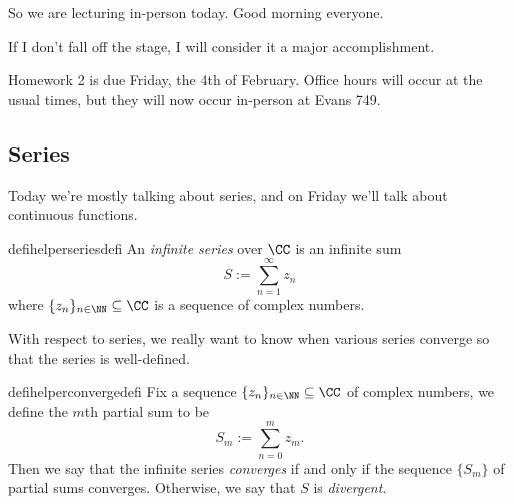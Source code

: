 
So we are lecturing in-person today. Good morning everyone.
\begin{quot}
	If I don't fall off the stage, I will consider it a major accomplishment.
\end{quot}
Homework 2 is due Friday, the 4th of February. Office hours will occur at the usual times, but they will now occur in-person at Evans 749.

\subsection{Series}
Today we're mostly talking about series, and on Friday we'll talk about continuous functions.
\begin{restatable}[Series]{defihelper}{seriesdefi} 
	An \textit{infinite series} over $\CC$ is an infinite sum
	\[S:=\sum_{n=1}^\infty z_n\]
	where $\{z_n\}_{n\in\NN}\subseteq\CC$ is a sequence of complex numbers.
\end{restatable}
\noindent With respect to series, we really want to know when various series converge so that the series is well-defined.
\begin{restatable}{defihelper}{convergedefi} 
	Fix a sequence $\{z_n\}_{n\in\NN}\subseteq\CC$ of complex numbers, we define the $m$th partial sum to be
	\[S_m:=\sum_{n=0}^mz_m.\]
	Then we say that the infinite series \textit{converges} if and only if the sequence $\{S_m\}$ of partial sums converges. Otherwise, we say that $S$ is \textit{divergent}.
\end{restatable}

